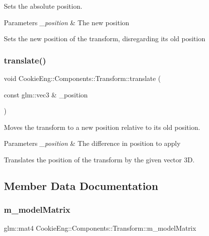 Sets the absolute position. 


\begin{DoxyParams}{Parameters}
{\em \+\_\+position} & The new position\\
\hline
\end{DoxyParams}
Sets the new position of the transform, disregarding its old position \mbox{\label{class_cookie_eng_1_1_components_1_1_transform_afe2e00e8126fd92eab8c2e1a5725b2c5}} 
\subsubsection{\texorpdfstring{translate()}{translate()}}
{\footnotesize\ttfamily void Cookie\+Eng\+::\+Components\+::\+Transform\+::translate (\begin{DoxyParamCaption}\item[{const glm\+::vec3 \&}]{\+\_\+position }\end{DoxyParamCaption})}



Moves the transform to a new position relative to its old position. 


\begin{DoxyParams}{Parameters}
{\em \+\_\+position} & The difference in position to apply\\
\hline
\end{DoxyParams}
Translates the position of the transform by the given vector 3D. 

\subsection{Member Data Documentation}
\mbox{\label{class_cookie_eng_1_1_components_1_1_transform_ab4c66323537c12117739471665c6ddf9}} 
\subsubsection{\texorpdfstring{m\+\_\+model\+Matrix}{m\_modelMatrix}}
{\footnotesize\ttfamily glm\+::mat4 Cookie\+Eng\+::\+Components\+::\+Transform\+::m\+\_\+model\+Matrix\hspace{0.3cm}{\ttfamily [protected]}}

